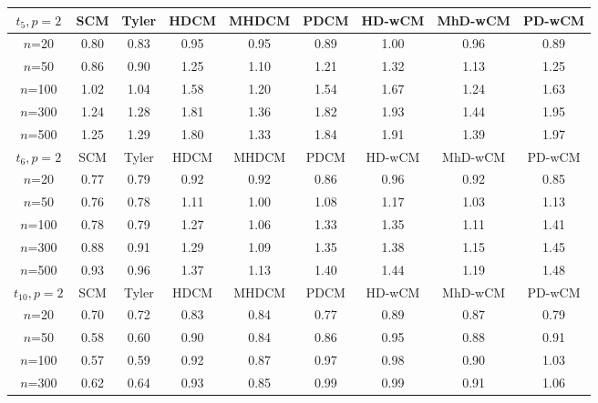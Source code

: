 \begin{table}[ht]
\centering
\begin{footnotesize}
    \begin{tabular}{c|cc|ccc|ccc}
    \hline
    $t_5, p=2$    & SCM  & Tyler & HDCM & MHDCM & PDCM & HD-wCM & MhD-wCM & PD-wCM \\ \hline
    $n$=20                   & 0.80 & 0.83  & 0.95   & 0.95   & 0.89  & 1.00    & 0.96    & 0.89   \\
    $n$=50                   & 0.86 & 0.90  & 1.25   & 1.10   & 1.21  & 1.32    & 1.13    & 1.25   \\
    $n$=100                  & 1.02 & 1.04  & 1.58   & 1.20   & 1.54  & 1.67    & 1.24    & 1.63   \\
    $n$=300                  & 1.24 & 1.28  & 1.81   & 1.36   & 1.82  & 1.93    & 1.44    & 1.95   \\
    $n$=500                  & 1.25 & 1.29  & 1.80   & 1.33   & 1.84  & 1.91    & 1.39    & 1.97   \\ \hline
    $t_6, p=2$    & SCM  & Tyler & HDCM & MHDCM & PDCM & HD-wCM & MhD-wCM & PD-wCM \\ \hline
    $n$=20                   & 0.77 & 0.79  & 0.92   & 0.92   & 0.86  & 0.96    & 0.92    & 0.85   \\
    $n$=50                   & 0.76 & 0.78  & 1.11   & 1.00   & 1.08  & 1.17    & 1.03    & 1.13   \\
    $n$=100                  & 0.78 & 0.79  & 1.27   & 1.06   & 1.33  & 1.35    & 1.11    & 1.41   \\
    $n$=300                  & 0.88 & 0.91  & 1.29   & 1.09   & 1.35  & 1.38    & 1.15    & 1.45   \\
    $n$=500                  & 0.93 & 0.96  & 1.37   & 1.13   & 1.40  & 1.44    & 1.19    & 1.48   \\ \hline
    $t_{10}, p=2$ & SCM  & Tyler & HDCM & MHDCM & PDCM & HD-wCM & MhD-wCM & PD-wCM \\ \hline
    $n$=20                   & 0.70 & 0.72  & 0.83   & 0.84   & 0.77  & 0.89    & 0.87    & 0.79   \\
    $n$=50                   & 0.58 & 0.60  & 0.90   & 0.84   & 0.86  & 0.95    & 0.88    & 0.91   \\
    $n$=100                  & 0.57 & 0.59  & 0.92   & 0.87   & 0.97  & 0.98    & 0.90    & 1.03   \\
    $n$=300                  & 0.62 & 0.64  & 0.93   & 0.85   & 0.99  & 0.99    & 0.91    & 1.06   \\

\end{tabular}
\end{footnotesize}
\end{table}
